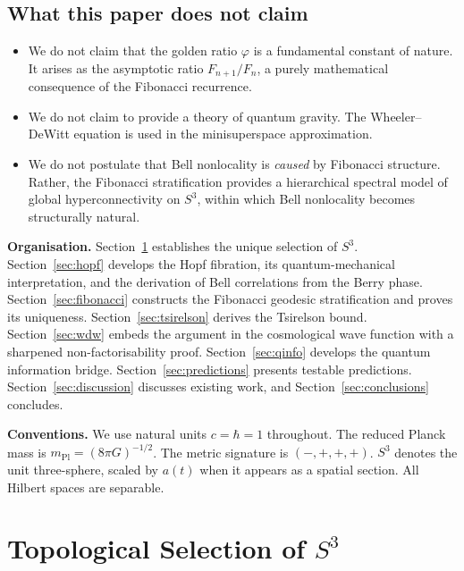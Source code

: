 \documentclass[12pt,a4paper]{article}
\theoremstyle{definition}
\theoremstyle{remark}
\begin{document}
\subsection*{What this paper does not claim}

\begin{itemize}
\item We do not claim that the golden ratio $\varphi$ is a fundamental constant
of nature. It arises as the asymptotic ratio $F_{n+1}/F_n$, a purely mathematical
consequence of the Fibonacci recurrence.
\item We do not claim to provide a theory of quantum gravity. The Wheeler--DeWitt
equation is used in the minisuperspace approximation.
\item We do not postulate that Bell nonlocality is \emph{caused} by Fibonacci
structure. Rather, the Fibonacci stratification provides a hierarchical spectral
model of global hyperconnectivity on $S^3$, within which Bell nonlocality becomes
structurally natural.
\end{itemize}

\medskip\noindent
\textbf{Organisation.} Section~\ref{sec:topology} establishes the unique selection
of $S^3$. Section~\ref{sec:hopf} develops the Hopf fibration, its quantum-mechanical
interpretation, and the derivation of Bell correlations from the Berry phase.
Section~\ref{sec:fibonacci} constructs the Fibonacci geodesic stratification and
proves its uniqueness. Section~\ref{sec:tsirelson} derives the Tsirelson bound.
Section~\ref{sec:wdw} embeds the argument in the cosmological wave function with a
sharpened non-factorisability proof. Section~\ref{sec:qinfo} develops the quantum
information bridge. Section~\ref{sec:predictions} presents testable predictions.
Section~\ref{sec:discussion} discusses existing work, and Section~\ref{sec:conclusions}
concludes.

\medskip\noindent
\textbf{Conventions.} We use natural units $c = \hbar = 1$ throughout. The reduced
Planck mass is $m_{\mathrm{Pl}} = (8\pi G)^{-1/2}$. The metric signature is
$(-,+,+,+)$. $S^3$ denotes the unit three-sphere, scaled by $a(t)$ when it appears
as a spatial section. All Hilbert spaces are separable.

\section{Topological Selection of $S^3$}
\label{sec:topology}
\end{document}
